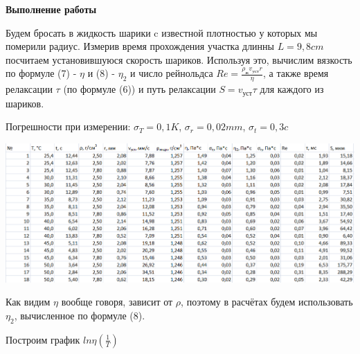 \documentclass[12pt]{article}
\begin{document}
    
    
    
    \begin{center}
    	\textbf{\large{Выполнение работы}}
    \end{center}
    
    Будем бросать в жидкость шарики c известной плотностью у которых мы померили радиус. Измерив время прохождения участка длинны $L=9,8cm$ посчитаем установившуюся скорость шариков. Используя это, вычислим вязкость по формуле (7) - $\eta$ и (8) - $\eta_2$ и число рейнольдса $Re = \frac{\rho_{ж} v_{уст} r}{\eta}$, а также время релаксации $\tau$ (по формуле (6)) и путь релаксации $S=v_{уст}\tau$ для каждого из шариков.
    
    Погрешности при измерении: $\sigma_T = 0,1K$, $\sigma_r = 0,02mm$, $\sigma_t = 0,3c$
    
    \begin{center}
    	\includegraphics[width=18cm]{table1.png}
    \end{center}
    
    Как видим $\eta$ вообще говоря, зависит от $\rho$, поэтому в расчётах будем использовать $\eta_2$, вычисленное по формуле (8).
    
    Построим график $ln\eta(\frac{1}{T})$
    
\end{document}
